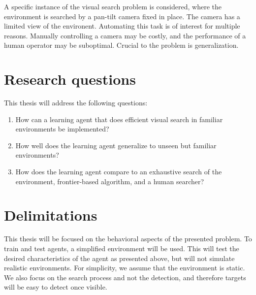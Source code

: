 A specific instance of the visual search problem is considered, where the environment is searched by a pan-tilt camera fixed in place.
The camera has a limited view of the environent.
Automating this task is of interest for multiple reasons.
Manually controlling a camera may be costly, and the performance of a human operator may be suboptimal.
Crucial to the problem is generalization.

\section{Research questions}
\label{sec:research-questions}

This thesis will address the following questions:

\begin{enumerate}
  \item How can a learning agent that does efficient visual search in familiar environments be implemented?
  \item How well does the learning agent generalize to unseen but familiar environments?
  \item How does the learning agent compare to an exhaustive search of the environment, frontier-based algorithm, and a human searcher?
\end{enumerate}

\section{Delimitations}
\label{sec:delimitations}

This thesis will be focused on the behavioral aspects of the presented problem.
To train and test agents, a simplified environment will be used. 
This will test the desired characteristics of the agent as presented above, but will not simulate realistic environments.
For simplicity, we assume that the environment is static. %
We also focus on the search process and not the detection, and therefore targets will be easy to detect once visible.

